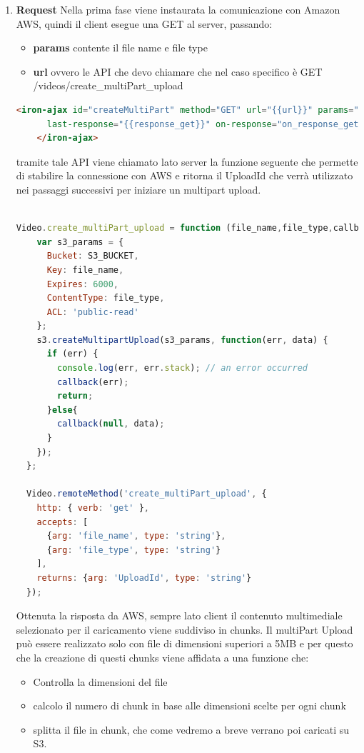 \begin{enumerate}
\item \textbf{Request}
   Nella prima fase viene instaurata la comunicazione con Amazon AWS, quindi il client esegue una GET al server, passando:
   \begin{itemize}
      \item \textbf{params} contente il file name e file type
      \item \textbf{url} ovvero le API che devo chiamare che nel caso specifico è GET /videos/create\_multiPart\_upload
    \end{itemize}

  \begin{lstlisting}[language=html]
    <iron-ajax id="createMultiPart" method="GET" url="{{url}}" params="{{params}}"
      last-response="{{response_get}}" on-response="on_response_get">
    </iron-ajax>
\end{lstlisting}
tramite tale API viene chiamato lato server la funzione seguente che permette di stabilire la connessione con AWS e ritorna il UploadId che verrà utilizzato nei passaggi successivi per iniziare un multipart upload.

\begin{lstlisting}[language=javascript]

Video.create_multiPart_upload = function (file_name,file_type,callback){
    var s3_params = {
      Bucket: S3_BUCKET,
      Key: file_name,
      Expires: 6000,
      ContentType: file_type,
      ACL: 'public-read'      
    };
    s3.createMultipartUpload(s3_params, function(err, data) {
      if (err) {
        console.log(err, err.stack); // an error occurred
        callback(err);
        return;
      }else{
        callback(null, data);
      }
    });
  };
  
  Video.remoteMethod('create_multiPart_upload', {
    http: { verb: 'get' },
    accepts: [
      {arg: 'file_name', type: 'string'},
      {arg: 'file_type', type: 'string'}
    ],
    returns: {arg: 'UploadId', type: 'string'}
  });

\end{lstlisting}
Ottenuta la risposta da AWS, sempre lato client il contenuto multimediale selezionato per il caricamento viene suddiviso in chunks.
Il multiPart Upload può essere realizzato solo con file di dimensioni superiori a 5MB e per questo che la creazione di questi chunks viene affidata a una funzione che:
\begin{itemize}
      \item Controlla la dimensioni del file
      \item calcolo il numero di chunk in base alle dimensioni scelte per ogni chunk
      \item splitta il file in chunk, che come vedremo a breve verrano poi caricati su S3.
    \end{itemize}



\end{enumerate}
